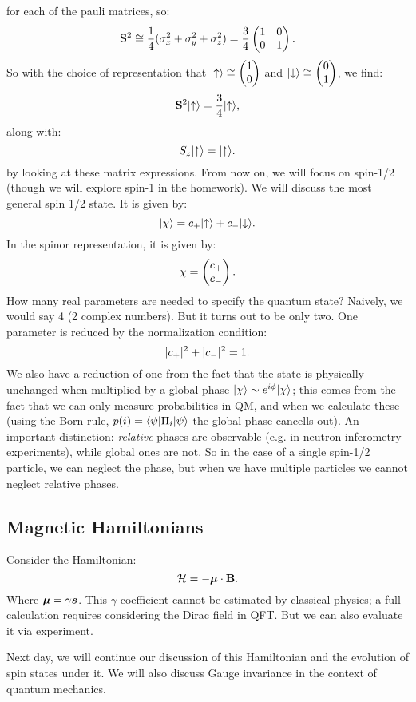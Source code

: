 for each of the pauli matrices, so:
\begin{equation}
    \mathbf{S}^2 \cong \frac{1}{4}(\sigma_x^2 + \sigma_y^2 + \sigma_z^2) = \frac{3}{4}\begin{pmatrix} 1 & 0 \\ 0 & 1 \end{pmatrix}.
\end{equation}
So with the choice of representation that $\lvert \uparrow \rangle \cong \begin{pmatrix}1 \\ 0\end{pmatrix}$ and $\lvert \downarrow \rangle \cong \begin{pmatrix}0\\ 1\end{pmatrix}$, we find:
\begin{equation}
    \mathbf{S}^2\lvert \uparrow \rangle = \frac{3}{4}\lvert \uparrow \rangle,
\end{equation}
along with:
\begin{equation}
    S_z\lvert \uparrow \rangle = \lvert \uparrow \rangle.
\end{equation}
by looking at these matrix expressions. From now on, we will focus on spin-1/2 (though we will explore spin-1 in the homework). We will discuss the most general spin 1/2 state. It is given by:
\begin{equation}
    \lvert \chi \rangle = c_+\lvert \uparrow \rangle + c_-\lvert \downarrow \rangle.
\end{equation}
In the spinor representation, it is given by:
\begin{equation}
    \chi = \begin{pmatrix}c_+ \\ c_-\end{pmatrix}.
\end{equation}
How many real parameters are needed to specify the quantum state? Naively, we would say 4 (2 complex numbers). But it turns out to be only two. One parameter is reduced by the normalization condition:
\begin{equation}
    \lvert c_+ \rvert^2 + \lvert c_- \rvert^2 = 1.
\end{equation}
We also have a reduction of one from the fact that the state is physically unchanged when multiplied by a global phase $\ket{\chi} \sim e^{i\phi}\ket{\chi}$; this comes from the fact that we can only measure probabilities in QM, and when we calculate these (using the Born rule, $p(i) = \langle \psi \rvert\Pi_i\lvert \psi \rangle$ the global phase cancells out). An important distinction: \emph{relative} phases are observable (e.g. in neutron inferometry experiments), while global ones are not. So in the case of a single spin-1/2 particle, we can neglect the phase, but when we have multiple particles we cannot neglect relative phases.

\subsection{Magnetic Hamiltonians}
Consider the Hamiltonian:
\begin{equation}
    \mathcal{H} = -\mbox{\boldmath$ \mu $} \cdot \mathbf{B}.
\end{equation}
Where $\mbox{\boldmath$ \mu $} = \gamma \mbox{\boldmath$ s $}$. This $\gamma$ coefficient cannot be estimated by classical physics; a full calculation requires considering the Dirac field in QFT. But we can also evaluate it via experiment.

Next day, we will continue our discussion of this Hamiltonian and the evolution of spin states under it. We will also discuss Gauge invariance in the context of quantum mechanics.


